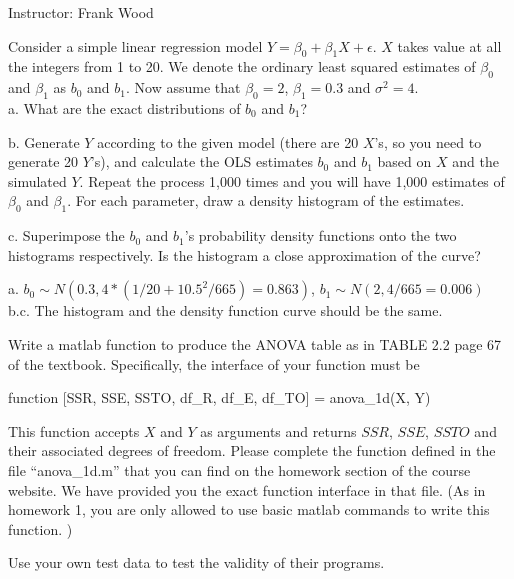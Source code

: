 \documentclass[12pt]{article}
\begin{document}
 \begin{center}
  Instructor: Frank Wood
 \end{center}
{}
\finishfirstpage



 {
  Consider a simple linear regression model $Y=\beta_0+\beta_1X+\epsilon$. $X$ takes value at all the integers from 1 to 20. We denote the ordinary least squared estimates of $\beta_0$ and $\beta_1$ as $b_0$ and $b_1$. Now assume that $\beta_0=2$, $\beta_1=0.3$ and $\sigma^2=4$.\\

 a. What are the exact distributions of $b_0$ and $b_1$?

 b. Generate $Y$ according to the given model (there are 20 $X$'s, so you need to generate 20 $Y$'s), and calculate the OLS estimates $b_0$ and $b_1$ based on $X$ and the simulated $Y$. Repeat the process 1,000 times and you will have 1,000 estimates of $\beta_0$ and $\beta_1$. For each parameter, draw a density histogram of the estimates.

 c. Superimpose the $b_0$ and $b_1$'s probability density functions onto the two histograms respectively. Is the histogram a
 close approximation of the curve?
   }
 { \vfill
  \answer
}
{
a. $b_0 \sim N(0.3, 4*(1/20+10.5^2/665)=0.863)$, $b_1 \sim N(2, 4/665=0.006)$\\
b.c. The histogram and the density function curve should be the same.
}


 {
Write a matlab function to produce the ANOVA table as in TABLE 2.2 page 67 of the textbook. Specifically, the interface of your function must be

\begin{center}                function [SSR, SSE, SSTO, df\_R, df\_E, df\_TO] = anova\_1d(X, Y)
\end{center}

This function accepts $X$ and $Y$ as arguments and returns $SSR$, $SSE$, $SSTO$ and their associated degrees of freedom. Please complete the function defined in the file ``anova\_1d.m'' that you can find on the homework section of the course website. We have provided you the exact function interface in that file. (As in homework 1, you are only allowed to use basic matlab commands to write this function. )

  }
 { \vfill
  \answer
} {Use your own test data to test the validity of their programs.}
\end{document}
